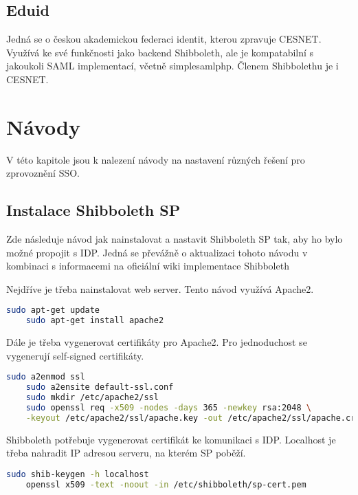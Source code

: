 \section{Eduid} %

Jedná se o českou akademickou federaci identit, kterou zpravuje CESNET. 
Využívá ke své funkčnosti jako backend Shibboleth, ale je kompatabilní s jakoukoli SAML implementací, včetně simplesamlphp. Členem Shibbolethu je i CESNET.


\chapter{Návody}
\label{návod}

V této kapitole jsou k nalezení návody na nastavení různých řešení pro zprovoznění SSO.

\section{Instalace Shibboleth SP} \label{instalaceShibboleth}

Zde následuje návod jak nainstalovat a nastavit Shibboleth SP tak, aby ho bylo možné propojit s IDP. Jedná se převážně o aktualizaci tohoto návodu\cite{shibbolethSpInstallation} v kombinaci s informacemi na oficiální wiki implementace Shibboleth\cite{shibbolethWikiSP}

Nejdříve je třeba nainstalovat web server. Tento návod využívá Apache2.
\begin{lstlisting}[language=Bash]
    sudo apt-get update
    sudo apt-get install apache2
\end{lstlisting}

Dále je třeba vygenerovat certifikáty pro Apache2. Pro jednoduchost se vygenerují self-signed certifikáty.
\begin{lstlisting}[language=Bash]
    sudo a2enmod ssl
    sudo a2ensite default-ssl.conf
    sudo mkdir /etc/apache2/ssl
    sudo openssl req -x509 -nodes -days 365 -newkey rsa:2048 \
    -keyout /etc/apache2/ssl/apache.key -out /etc/apache2/ssl/apache.crt
\end{lstlisting}

Shibboleth potřebuje vygenerovat certifikát ke komunikaci s IDP. Localhost je třeba nahradit IP adresou serveru, na kterém SP poběží.
\begin{lstlisting}[language=Bash]
    sudo shib-keygen -h localhost
    openssl x509 -text -noout -in /etc/shibboleth/sp-cert.pem
\end{lstlisting}

